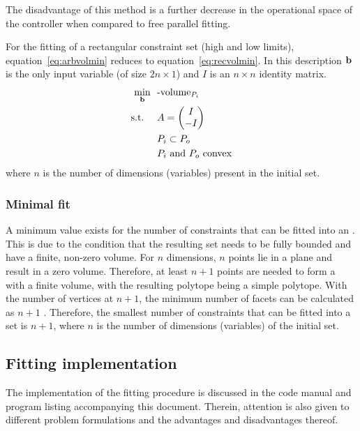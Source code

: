 The disadvantage of this method is a further decrease in the operational space of the controller when compared to free parallel fitting.

For the fitting of a rectangular constraint set (high and low limits), equation~\ref{eq:arbvolmin} reduces to equation~\ref{eq:recvolmin}.
In this description ${\bf {b}}$ is the only input variable (of size $2n \times 1$) and $I$ is an $n\times n$ identity matrix.
\begin{align}
  \label{eq:recvolmin}
    \min_{{\bf {b}}}~~&\text{-volume}_{P_i}\\
    \text{s.t.}~~~~ &A = \begin{pmatrix} I \\ -I \end{pmatrix} \notag \\
                    &P_i \subset P_o \notag \\
                    &P_i \text{~and~} P_o \text{~convex} \notag
\end{align}
where $n$ is the number of dimensions (variables) present in the initial set.

\subsubsection{Minimal fit}
A minimum value exists for the number of constraints that can be fitted into an \npoly.
This is due to the condition that the resulting set needs to be fully bounded and have a finite, non-zero volume.
For $n$ dimensions, $n$ points lie in a plane and result in a zero volume.
Therefore, at least $n+1$ points are needed to form a \npoly with a finite volume, with the resulting polytope being a simple polytope.
With the number of vertices at $n+1$, the minimum number of facets can be calculated as $n+1$ \citep{barnette}. 
Therefore, the smallest number of constraints that can be fitted into a set is $n+1$, where $n$ is the number of dimensions (variables) of the initial set.

\subsection{Fitting implementation}
The implementation of the fitting procedure is discussed in the code manual and program listing accompanying this document.
Therein, attention is also given to different problem formulations and the advantages and disadvantages thereof.

